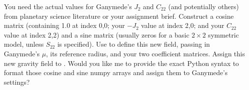 {}\markdownRendererOlBegin
{} You need the actual values for Ganymede's $J_2$ and $C_{22}$ (and potentially others) from planetary science literature or your assignment brief.\markdownRendererOlItemEnd 
{} Construct a cosine matrix (containing 1.0 at index 0,0; your $-J_2$ value at index 2,0; and your $C_{22}$ value at index 2,2) and a sine matrix (usually zeros for a basic $2\times2$ symmetric model, unless $S_{22}$ is specified).\markdownRendererOlItemEnd 
{} Use  to define this new field, passing in Ganymede's $\mu$, its reference radius, and your two coefficient matrices.\markdownRendererOlItemEnd 
{} Assign this new gravity field to .\markdownRendererOlItemEnd 
\markdownRendererOlEnd \markdownRendererInterblockSeparator
{}\markdownRendererInterblockSeparator
{}Would you like me to provide the exact Python syntax to format those cosine and sine numpy arrays and assign them to Ganymede's settings?\markdownRendererInterblockSeparator
{}\markdownRendererThematicBreak{}\markdownRendererInterblockSeparator
{}
\markdownRendererSectionEnd 
\markdownRendererSectionEnd \markdownRendererSectionBegin
{}\markdownRendererInterblockSeparator
